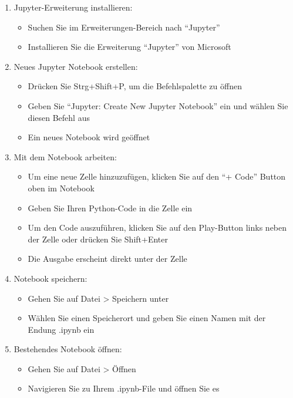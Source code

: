\documentclass[
  nswissgerman,
  a4paper,
  DIV=11,
  numbers=noendperiod,
  ngerman]{scrreprt}
\providecommand{\tightlist}{%
  \setlength{\itemsep}{0pt}\setlength{\parskip}{0pt}}
\begin{document}
\begin{enumerate}
\def\labelenumi{\arabic{enumi}.}
\tightlist
\item
  Jupyter-Erweiterung installieren:

  \begin{itemize}
  \tightlist
  \item
    Suchen Sie im Erweiterungen-Bereich nach ``Jupyter''
  \item
    Installieren Sie die Erweiterung ``Jupyter'' von Microsoft
  \end{itemize}
\item
  Neues Jupyter Notebook erstellen:

  \begin{itemize}
  \tightlist
  \item
    Drücken Sie Strg+Shift+P, um die Befehlspalette zu öffnen
  \item
    Geben Sie ``Jupyter: Create New Jupyter Notebook'' ein und wählen
    Sie diesen Befehl aus
  \item
    Ein neues Notebook wird geöffnet
  \end{itemize}
\item
  Mit dem Notebook arbeiten:

  \begin{itemize}
  \tightlist
  \item
    Um eine neue Zelle hinzuzufügen, klicken Sie auf den ``+ Code''
    Button oben im Notebook
  \item
    Geben Sie Ihren Python-Code in die Zelle ein
  \item
    Um den Code auszuführen, klicken Sie auf den Play-Button links neben
    der Zelle oder drücken Sie Shift+Enter
  \item
    Die Ausgabe erscheint direkt unter der Zelle
  \end{itemize}
\item
  Notebook speichern:

  \begin{itemize}
  \tightlist
  \item
    Gehen Sie auf Datei \textgreater{} Speichern unter
  \item
    Wählen Sie einen Speicherort und geben Sie einen Namen mit der
    Endung .ipynb ein
  \end{itemize}
\item
  Bestehendes Notebook öffnen:

  \begin{itemize}
  \tightlist
  \item
    Gehen Sie auf Datei \textgreater{} Öffnen
  \item
    Navigieren Sie zu Ihrem .ipynb-File und öffnen Sie es
  \end{itemize}
\end{enumerate}
\end{document}
